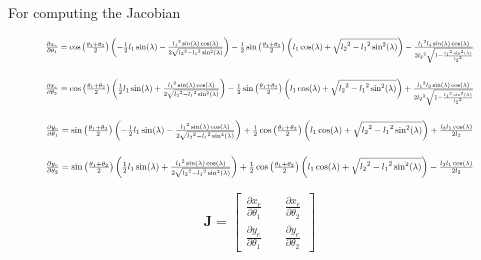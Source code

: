 \documentclass[11pt, titlepage]{article}
\begin{document}
For computing the Jacobian

\begin{equation}
\resizebox{.9 \textwidth}{!} 
{
$\frac{\partial x_e}{\partial \theta_1} = \cos\left(\frac{\theta_1+\theta_2}{2}\right)\left(-\frac{1}{2}l_1\sin(\lambda)-\frac{{l_1}^2\sin(\lambda)\cos(\lambda)}{2\sqrt{{l_2}^2-{l_1}^2\sin^2(\lambda)}}\right)
- \frac{1}{2}\sin\left(\frac{\theta_1+\theta_2}{2}\right)\left(l_1\cos(\lambda)+\sqrt{{l_2}^2-{l_1}^2\sin^2(\lambda)}\right)
- \frac{{l_1}^2l_3\sin(\lambda)\cos(\lambda)}{2{l_2}^2\sqrt{1-\frac{{l_1}^2\sin^2(\lambda)}{{l_2}^2}}}$
}
\end{equation}

\begin{equation}
\resizebox{.9 \textwidth}{!} 
{
$\frac{\partial x_e}{\partial \theta_2} = \cos\left(\frac{\theta_1+\theta_2}{2}\right)\left(\frac{1}{2}l_1\sin(\lambda)+\frac{{l_1}^2\sin(\lambda)\cos(\lambda)}{2\sqrt{{l_2}^2-{l_1}^2\sin^2(\lambda)}}\right)
- \frac{1}{2}\sin\left(\frac{\theta_1+\theta_2}{2}\right)\left(l_1\cos(\lambda)+\sqrt{{l_2}^2-{l_1}^2\sin^2(\lambda)}\right)
+ \frac{{l_1}^2l_3\sin(\lambda)\cos(\lambda)}{2{l_2}^2\sqrt{1-\frac{{l_1}^2\sin^2(\lambda)}{{l_2}^2}}}$
}
\end{equation}

\begin{equation}
\resizebox{.9 \textwidth}{!} 
{
$\frac{\partial y_e}{\partial \theta_1} = \sin\left(\frac{\theta_1+\theta_2}{2}\right)\left(-\frac{1}{2}l_1\sin(\lambda)-\frac{{l_1}^2\sin(\lambda)\cos(\lambda)}{2\sqrt{{l_2}^2-{l_1}^2\sin^2(\lambda)}}\right)
+ \frac{1}{2}\cos\left(\frac{\theta_1+\theta_2}{2}\right)\left(l_1\cos(\lambda)+\sqrt{{l_2}^2-{l_1}^2\sin^2(\lambda)}\right)
+ \frac{l_3l_1\cos(\lambda)}{2l_2}$
}
\end{equation}

\begin{equation}
\resizebox{.9 \textwidth}{!} 
{
$\frac{\partial y_e}{\partial \theta_2} = \sin\left(\frac{\theta_1+\theta_2}{2}\right)\left(\frac{1}{2}l_1\sin(\lambda)+\frac{{l_1}^2\sin(\lambda)\cos(\lambda)}{2\sqrt{{l_2}^2-{l_1}^2\sin^2(\lambda)}}\right)
+ \frac{1}{2}\cos\left(\frac{\theta_1+\theta_2}{2}\right)\left(l_1\cos(\lambda)+\sqrt{{l_2}^2-{l_1}^2\sin^2(\lambda)}\right)
- \frac{l_3l_1\cos(\lambda)}{2l_2}$
}
\end{equation}

$$
	\textbf{J} = 
\begin{bmatrix}
\frac{\partial x_e}{\partial \theta_1} &&
\frac{\partial x_e}{\partial \theta_2} \\
\frac{\partial y_e}{\partial \theta_1} &&
\frac{\partial y_e}{\partial \theta_2}
\end{bmatrix}
$$
\end{document}

